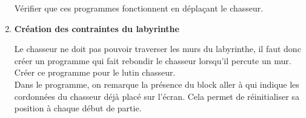 \begin{enumerate}
\begin{center}
            \begin{scratch}
            \end{scratch}
         \end{center} \medskip
         Vérifier que ces programmes fonctionnent en déplaçant le chasseur.
   
\pagebreak

         \item {\bf Création des contraintes du labyrinthe} \pfh{} \\
         \begin{minipage}{9cm}
            Le chasseur ne doit pas pouvoir traverser les murs du labyrinthe, il faut donc créer un programme qui fait \og rebondir \fg{} le chasseur lorsqu'il percute un mur. \\
            Créer ce programme pour le lutin chasseur. \\
            Dans le programme, on remarque la présence du block \textcolor{B1}{aller à} qui indique les cordonnées du chasseur déjà placé sur l'écran. Cela permet de réinitialiser sa position à chaque début de partie. \\
         \end{minipage}
         \qquad
         \begin{minipage}{6cm}
            \begin{scratch}
                  {
                     {
                     }
                  }
            \end{scratch}
         \end{minipage}
      \end{enumerate}
   
